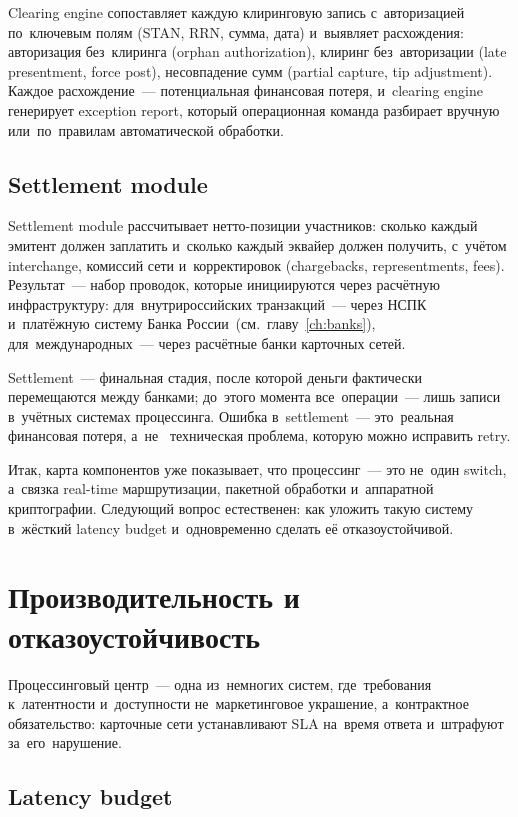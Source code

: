 Clearing engine сопоставляет каждую клиринговую запись
с~авторизацией по~ключевым полям (STAN, RRN, сумма, дата)
и~выявляет расхождения: авторизация без~клиринга (orphan
authorization), клиринг без~авторизации (late presentment,
force post), несовпадение сумм (partial capture, tip
adjustment). Каждое расхождение~--- потенциальная финансовая
потеря, и~clearing engine генерирует exception report,
который операционная команда разбирает вручную или~по~правилам
автоматической обработки.

\subsection*{Settlement module}

Settlement module рассчитывает нетто-позиции участников:
сколько каждый эмитент должен заплатить и~сколько каждый
эквайер должен получить, с~учётом interchange, комиссий
сети и~корректировок (chargebacks, representments, fees).
Результат~--- набор проводок, которые инициируются через
расчётную инфраструктуру: для~внутрироссийских транзакций~---
через НСПК и~платёжную систему Банка
России~(см.~главу~\ref{ch:banks}), для~международных~---
через расчётные банки карточных сетей.

Settlement~--- финальная стадия, после которой деньги фактически
перемещаются между банками; до~этого момента все~операции~---
лишь записи в~учётных системах процессинга. Ошибка
в~settlement~--- это~реальная финансовая потеря, а~не~
техническая проблема, которую можно исправить retry.


Итак, карта компонентов уже показывает, что процессинг~--- это
не~один switch, а~связка real-time маршрутизации, пакетной
обработки и~аппаратной криптографии. Следующий вопрос естественен:
как уложить такую систему в~жёсткий latency budget и~одновременно
сделать её отказоустойчивой.

\section{Производительность и отказоустойчивость}
\label{sec:pc-performance}

Процессинговый центр~--- одна из~немногих систем, где~требования
к~латентности и~доступности не~маркетинговое украшение,
а~контрактное обязательство: карточные сети устанавливают SLA
на~время ответа и~штрафуют за~его~нарушение.

\subsection*{Latency budget}


